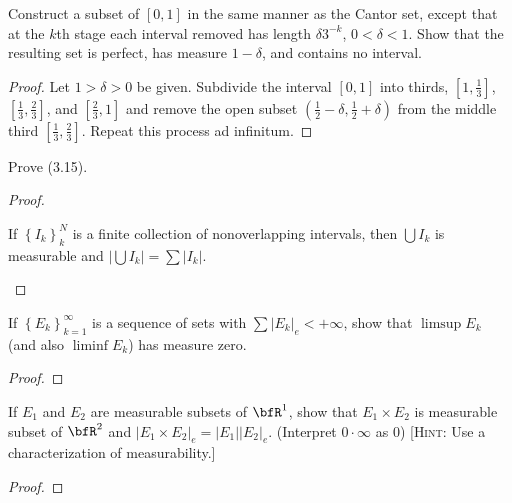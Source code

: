 \begin{problem}
Construct a subset of $[0,1]$ in the same manner as the Cantor set, except
that at the $k$th stage each interval removed has length $\delta 3^{-k}$,
$0<\delta<1$. Show that the resulting set is perfect, has measure
$1-\delta$, and contains no interval.
\end{problem}
\begin{proof}
Let $1>\delta>0$ be given. Subdivide the interval $[0,1]$ into thirds,
$\left[1,\tfrac{1}{3}\right]$, $\left[\tfrac{1}{3},\tfrac{2}{3}\right]$,
and $\left[\tfrac{2}{3},1\right]$ and remove the open subset
$\left(\tfrac{1}{2}-\delta,\tfrac{1}{2}+\delta\right)$ from the middle
third $\left[\tfrac{1}{3},\tfrac{2}{3}\right]$. Repeat this process ad
infinitum.
\end{proof}
\newpage

\begin{problem}
Prove (3.15).
\end{problem}
\begin{proof}
\begin{lemma*}
If $\left\{I_k\right\}_k^N$ is a finite collection of nonoverlapping
intervals, then $\bigcup I_k$ is measurable and $\left|\bigcup
  I_k\right|=\sum\left|I_k\right|$.
\end{lemma*}
\end{proof}
\newpage

\begin{problem}
If $\left\{E_k\right\}_{k=1}^\infty$ is a sequence of sets with
$\sum\left|E_k\right|_e<+\infty$, show that $\limsup E_k$ (and
also $\liminf E_k$) has measure zero.
\end{problem}
\begin{proof}
\end{proof}
\newpage

\begin{problem}
If $E_1$ and $E_2$ are measurable subsets of $\bfR^1$, show that $E_1\times
E_2$ is measurable subset of $\bfR^2$ and $\left|E_1\times
  E_2\right|_e=\left|E_1\right|\left|E_2\right|_e$. (Interpret
$0\cdot\infty$ as $0$) [\textsc{Hint:} Use a characterization of
measurability.]
\end{problem}
\begin{proof}
\end{proof}
\newpage

